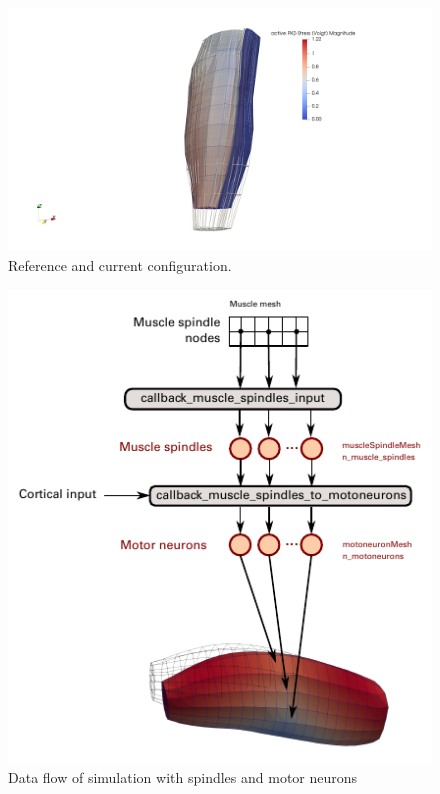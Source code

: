 \begin{figure}[H]
  \centering%
  \includegraphics[width=\textwidth]{images/results/application/neuromuscular_contraction0.png}%
  \caption{Reference and current configuration.}%
  \label{fig:neuromuscular_contraction0}%
\end{figure}


\begin{figure}[H]
  \centering%
  \includegraphics[width=\textwidth]{images/results/application/schematic_spindles.pdf}%
  \caption{Data flow of simulation with spindles and motor neurons}%
  \label{fig:neuromuscular_schematic}%
\end{figure}

